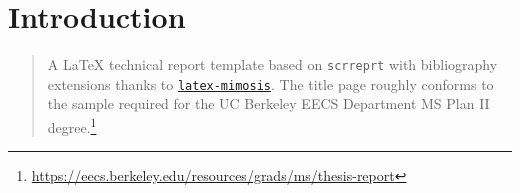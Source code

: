 \chapter{Introduction}

\begin{quote}
    A \LaTeX{} technical report template based on \texttt{scrreprt} \cite{KOMA-Script} with bibliography extensions thanks to \href{https://github.com/Submanifold/latex-mimosis}{\texttt{latex-mimosis}}. The title page  roughly conforms to the sample required for the UC Berkeley EECS Department MS Plan II degree.\footnote{\url{https://eecs.berkeley.edu/resources/grads/ms/thesis-report}}
\end{quote}
\blindtext[1]

\blindtext[1]